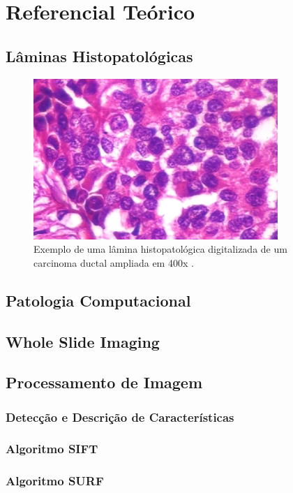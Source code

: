 \chapter{Referencial Teórico}

\section{Lâminas Histopatológicas}

\begin{figure}[h]
    \centering
    \includegraphics[width=350px, height=230px]{figuras/introducao/ductal-carcinoma-400x.eps}
    \caption{Exemplo de uma lâmina histopatológica digitalizada de um carcinoma ductal ampliada em 400x \cite{spanhol2016dataset}.}
    \label{fig:carcinoma}
\end{figure}

\section{Patologia Computacional}

\section{Whole Slide Imaging}

\section{Processamento de Imagem}
\subsection{Detecção e Descrição de Características}
\subsection{Algoritmo SIFT}
\subsection{Algoritmo SURF}
